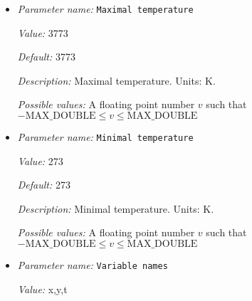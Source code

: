 \begin{itemize}
{\it Description:} The formula that denotes the function you want to evaluate for particular values of the independent variables. This expression may contain any of the usual operations such as addition or multiplication, as well as all of the common functions such as `sin' or `cos'. In addition, it may contain expressions like `if(x>0, 1, -1)' where the expression evaluates to the second argument if the first argument is true, and to the third argument otherwise. For a full overview of possible expressions accepted see the documentation of the muparser library at http://muparser.beltoforion.de/.

If the function you are describing represents a vector-valued function with multiple components, then separate the expressions for individual components by a semicolon.


{\it Possible values:} Any string
\item {\it Parameter name:} {\tt Maximal temperature}
\label{parameters:Boundary temperature model/Function/Maximal temperature}


{\it Value:} 3773


{\it Default:} 3773


{\it Description:} Maximal temperature. Units: K.


{\it Possible values:} A floating point number $v$ such that $-\text{MAX\_DOUBLE} \leq v \leq \text{MAX\_DOUBLE}$
\item {\it Parameter name:} {\tt Minimal temperature}
\label{parameters:Boundary temperature model/Function/Minimal temperature}


{\it Value:} 273


{\it Default:} 273


{\it Description:} Minimal temperature. Units: K.


{\it Possible values:} A floating point number $v$ such that $-\text{MAX\_DOUBLE} \leq v \leq \text{MAX\_DOUBLE}$
\item {\it Parameter name:} {\tt Variable names}
\label{parameters:Boundary temperature model/Function/Variable names}


{\it Value:} x,y,t



\end{itemize}
